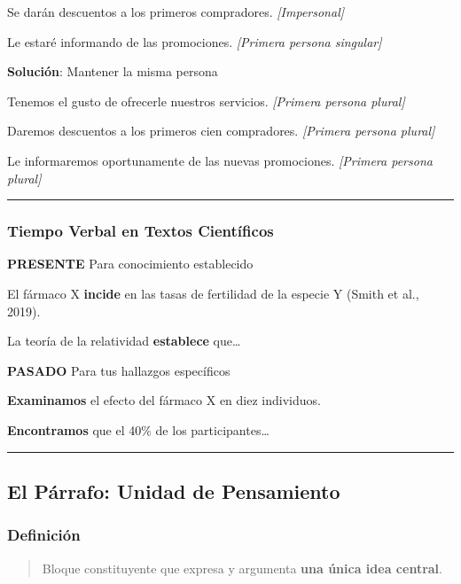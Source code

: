 \documentclass[
  11pt,
]{beaner}
\begin{document}
Se darán descuentos a los primeros compradores. \emph{{[}Impersonal{]}}

Le estaré informando de las promociones. \emph{{[}Primera persona
singular{]}}

\textbf{Solución}: Mantener la misma persona

Tenemos el gusto de ofrecerle nuestros servicios. \emph{{[}Primera
persona plural{]}}

Daremos descuentos a los primeros cien compradores. \emph{{[}Primera
persona plural{]}}

Le informaremos oportunamente de las nuevas promociones.
\emph{{[}Primera persona plural{]}}

\begin{center}\rule{0.5\linewidth}{0.5pt}\end{center}

\subsubsection{Tiempo Verbal en Textos
Científicos}\label{tiempo-verbal-en-textos-cientuxedficos}

\textbf{PRESENTE} Para conocimiento establecido

El fármaco X \textbf{incide} en las tasas de fertilidad de la especie Y
(Smith et al., 2019).

La teoría de la relatividad \textbf{establece} que\ldots{}

\textbf{PASADO} Para tus hallazgos específicos

\textbf{Examinamos} el efecto del fármaco X en diez individuos.

\textbf{Encontramos} que el 40\% de los participantes\ldots{}

\begin{center}\rule{0.5\linewidth}{0.5pt}\end{center}

\subsection{El Párrafo: Unidad de
Pensamiento}\label{el-puxe1rrafo-unidad-de-pensamiento}

\subsubsection{Definición}\label{definiciuxf3n-2}

\begin{quote}
Bloque constituyente que expresa y argumenta \textbf{una única idea
central}.
\end{quote}
\end{document}

